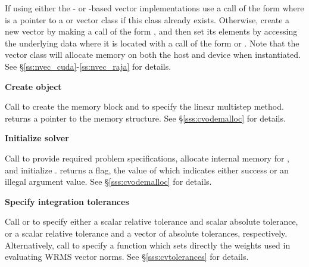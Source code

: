 \begin{Steps}
  If using either the {\cuda}- or {\raja}-based vector implementations
  use a call of the form
   where  is a pointer to a 
  or  vector class if this class already exists.  Otherwise,
  create a new vector
  by making a call of the form , and then set its
  elements by accessing the underlying data where it is located
  with a call of the form
   or .
  Note that the vector class will allocate memory on both the host and device
  when instantiated.  See \S\ref{ss:nvec_cuda}-\ref{ss:nvec_raja} for details.


\item\label{i:cvode_create}
  {\bf Create {\cvodes} object}

  Call 
  to create the {\cvodes} memory block and to specify the
  linear multistep method.
   returns a pointer to the {\cvodes} memory structure.
  See \S\ref{sss:cvodemalloc} for details.

\item\label{i:cvode_malloc}
  {\bf Initialize {\cvodes} solver}

  Call 
  to provide required problem specifications, allocate internal memory for
  {\cvodes}, and initialize {\cvodes}.
   returns a flag, the value of which indicates either success or
  an illegal argument value.  See \S\ref{sss:cvodemalloc} for details.

\item
  {\bf Specify integration tolerances}

  Call  or 
  to specify either a scalar relative tolerance and scalar absolute tolerance, or
  a scalar relative tolerance and a vector of absolute tolerances, respectively.
  Alternatively, call  to specify a function which sets
  directly the weights used in evaluating WRMS vector norms.
  See \S\ref{sss:cvtolerances} for details.


\end{Steps}
